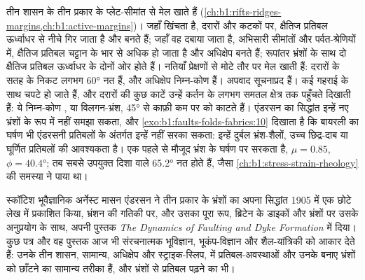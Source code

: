 तीन शासन  के तीन प्रकार के प्लेट-सीमांत से मेल खाते हैं (\cref{ch:b1:rifts-ridges-margins,ch:b1:active-margins})। जहाँ  खिंचता है, दरारों और कटकों पर, क्षैतिज प्रतिबल ऊर्ध्वाधर से नीचे गिर जाता है और  बनते हैं; जहाँ वह दबाया जाता है, अभिसारी सीमांतों और पर्वत-श्रेणियों में, क्षैतिज प्रतिबल चट्टान के भार से अधिक हो जाता है और अधिक्षेप बनते हैं; रूपांतर भ्रंशों के साथ दो क्षैतिज प्रतिबल ऊर्ध्वाधर के दोनों ओर होते हैं। नतियाँ प्रेक्षणों से मोटे तौर पर मेल खाती हैं: दरारों के  सतह के निकट लगभग \ang{60} नत हैं, और अधिक्षेप निम्न-कोण  हैं। अपवाद सूचनाप्रद हैं। कई  गहराई के साथ चपटे हो जाते हैं, और दरारों की कुछ काटें उन्हें कर्तन के लगभग समतल क्षेत्र तक पहुँचते दिखाती हैं: ये निम्न-कोण , या विलगन-भ्रंश, \ang{45} से काफ़ी कम पर  को काटते हैं। एंडरसन का सिद्धांत इन्हें नए भ्रंशों के रूप में नहीं समझा सकता, और \cref{exo:b1:faults-folds-fabrics:10} दिखाता है कि बायरली का घर्षण भी एंडरसनी प्रतिबलों के अंतर्गत इन्हें नहीं सरका सकता: इन्हें दुर्बल भ्रंश-शैलों, उच्च छिद्र-दाब या घूर्णित प्रतिबलों की आवश्यकता है। एक पहले से मौजूद भ्रंश  के घर्षण पर सरकता है, $\mu = 0.85$, $\phi = \ang{40.4}$; तब सबसे उपयुक्त दिशा वाले  \ang{65.2} नत होते हैं, जैसा \cref{ch:b1:stress-strain-rheology} की समस्या ने पाया था।

\begin{history}[एंडरसन के भ्रंश]
स्कॉटिश भूवैज्ञानिक अर्नेस्ट मासन एंडरसन ने तीन प्रकार के भ्रंशों का अपना सिद्धांत 1905 में एक छोटे लेख में प्रकाशित किया, भ्रंशन की गतिकी पर, और उसका पूरा रूप, ब्रिटेन के डाइकों और भ्रंशों पर उसके अनुप्रयोग के साथ, अपनी पुस्तक \emph{The Dynamics of Faulting and Dyke Formation} में दिया। कुछ पत्र और वह पुस्तक आज भी संरचनात्मक भूविज्ञान, भूकंप-विज्ञान और शैल-यांत्रिकी को आकार देते हैं: उनके तीन शासन, सामान्य, अधिक्षेप और स्ट्राइक-स्लिप,  में प्रतिबल-अवस्थाओं और उनके बनाए भ्रंशों को छाँटने का सामान्य तरीका हैं, और भ्रंशों से प्रतिबल पढ़ने का भी।
\end{history}

